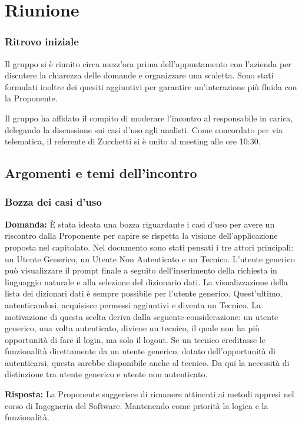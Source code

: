 \section{Riunione}
\subsubsection{Ritrovo iniziale}
Il gruppo si è riunito circa mezz’ora prima dell’appuntamento con l’azienda per discutere la chiarezza delle domande e organizzare una scaletta. Sono stati formulati inoltre dei quesiti aggiuntivi per garantire un’interazione più fluida con la Proponente.

Il gruppo ha affidato il compito di moderare l’incontro al responsabile in carica, delegando la discussione sui casi d’uso agli analisti. Come concordato per via telematica, il referente di Zucchetti si è unito al meeting alle ore 10:30.

\subsection{Argomenti e temi dell'incontro}


\subsubsection{Bozza dei casi d'uso}

\textbf{Domanda:} È stata ideata una bozza riguardante i casi d'uso per avere un riscontro dalla Proponente per capire se rispetta la visione dell’applicazione proposta nel capitolato.
Nel documento sono stati pensati i tre attori principali: un Utente Generico, un Utente Non Autenticato e un Tecnico.
L'utente generico può visualizzare il prompt finale a seguito dell'inserimento della richiesta in linguaggio naturale e alla selezione del dizionario dati. La visualizzazione della lista dei dizionari dati è sempre possibile per l'utente generico. Quest'ultimo, autenticandosi, acquisisce permessi aggiuntivi e diventa un Tecnico.
La motivazione di questa scelta deriva dalla seguente considerazione: un utente generico, una volta autenticato, diviene un tecnico, il quale non ha più opportunità di fare il login, ma solo il logout. Se un tecnico ereditasse le funzionalità direttamente da un utente generico, dotato dell'opportunità di autenticarsi, questa sarebbe disponibile anche al tecnico. Da qui la necessità di distinzione tra utente generico e utente non autenticato.

\textbf{Risposta:} La Proponente suggerisce di rimanere attinenti ai metodi appresi nel corso di Ingegneria del Software. Mantenendo come priorità la logica e la funzionalità.

